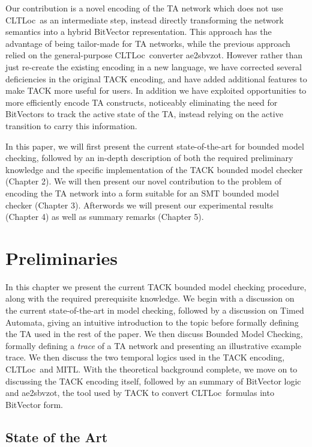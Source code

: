 \documentclass[a4paper,11pt]{report}
\theoremstyle{definition}
\newcommand{\cltloc}{CLTLoc}
\newcommand{\aez}{ae2sbvzot}
\begin{document}
Our contribution is a novel encoding of the TA network which does not use
\cltloc\ as an intermediate step, instead directly transforming the network
semantics into a hybrid BitVector representation. This approach has the
advantage of being tailor-made for TA networks, while the previous approach
relied on the general-purpose \cltloc\ converter \aez. However rather than just
re-create the existing encoding in a new language, we have corrected several
deficiencies in the original TACK encoding, and have added additional features
to make TACK more useful for users. In addition we have exploited opportunities
to more efficiently encode TA constructs, noticeably eliminating the need for
BitVectors to track the active state of the TA, instead relying on the active
transition to carry this information.

In this paper, we will first present the current state-of-the-art for bounded
model checking, followed by an in-depth description of both the required
preliminary knowledge and the specific implementation of the TACK bounded model
checker (Chapter 2). We will then present our novel contribution to the problem
of encoding the TA network into a form suitable for an SMT bounded model checker
(Chapter 3). Afterwords we will present our experimental results (Chapter 4) as
well as summary remarks (Chapter 5).

\chapter{Preliminaries}\label{prelims}

In this chapter we present the current TACK bounded model checking procedure,
along with the required prerequisite knowledge. We begin with a discussion on
the current state-of-the-art in model checking, followed by a discussion on
Timed Automata, giving an intuitive introduction to the topic before formally
defining the TA used in the rest of the paper. We then discuss Bounded Model
Checking, formally defining a \emph{trace} of a TA network and presenting an
illustrative example trace. We then discuss the two temporal logics used in the
TACK encoding, \cltloc\ and MITL\@. With the theoretical background complete, we
move on to discussing the TACK encoding itself, followed by an summary of
BitVector logic and \aez, the tool used by TACK to convert \cltloc\ formulas
into BitVector form.

\section{State of the Art}\label{stateoftheart}
\end{document}
